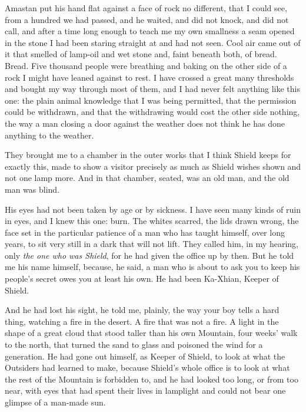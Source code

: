 Amastan put his hand flat against a face of rock no different, that I could see, from a hundred we had passed, and he waited, and did not knock, and did not call, and after a time long enough to teach me my own smallness a seam opened in the stone I had been staring straight at and had not seen. Cool air came out of it that smelled of lamp-oil and wet stone and, faint beneath both, of bread. Bread. Five thousand people were breathing and baking on the other side of a rock I might have leaned against to rest. I have crossed a great many thresholds and bought my way through most of them, and I had never felt anything like this one: the plain animal knowledge that I was being permitted, that the permission could be withdrawn, and that the withdrawing would cost the other side nothing, the way a man closing a door against the weather does not think he has done anything to the weather.\par

They brought me to a chamber in the outer works that I think Shield keeps for exactly this, made to show a visitor precisely as much as Shield wishes shown and not one lamp more. And in that chamber, seated, was an old man, and the old man was blind.\par

His eyes had not been taken by age or by sickness. I have seen many kinds of ruin in eyes, and I knew this one: burn. The whites scarred, the lids drawn wrong, the face set in the particular patience of a man who has taught himself, over long years, to sit very still in a dark that will not lift. They called him, in my hearing, only \emph{the one who was Shield}, for he had given the office up by then. But he told me his name himself, because, he said, a man who is about to ask you to keep his people's secret owes you at least his own. He had been Ka-Xhian, Keeper of Shield.\par

And he had lost his sight, he told me, plainly, the way your boy tells a hard thing, watching a fire in the desert. A fire that was not a fire. A light in the shape of a great cloud that stood taller than his own Mountain, four weeks' walk to the north, that turned the sand to glass and poisoned the wind for a generation. He had gone out himself, as Keeper of Shield, to look at what the Outsiders had learned to make, because Shield's whole office is to look at what the rest of the Mountain is forbidden to, and he had looked too long, or from too near, with eyes that had spent their lives in lamplight and could not bear one glimpse of a man-made sun.\par

